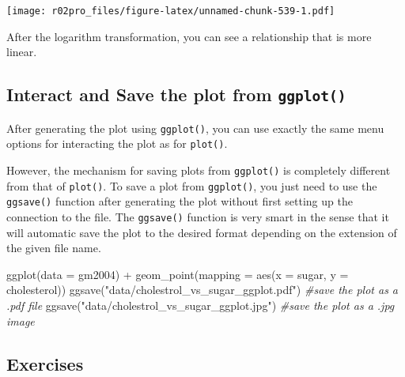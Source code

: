 \documentclass[
]{book}
\newenvironment{Shaded}{\begin{snugshade}}{\end{snugshade}}
\newcommand{\AttributeTok}[1]{\textcolor[rgb]{0.77,0.63,0.00}{#1}}
\newcommand{\CommentTok}[1]{\textcolor[rgb]{0.56,0.35,0.01}{\textit{#1}}}
\newcommand{\FunctionTok}[1]{\textcolor[rgb]{0.00,0.00,0.00}{#1}}
\newcommand{\NormalTok}[1]{#1}
\newcommand{\SpecialCharTok}[1]{\textcolor[rgb]{0.00,0.00,0.00}{#1}}
\newcommand{\StringTok}[1]{\textcolor[rgb]{0.31,0.60,0.02}{#1}}
\begin{document}
\texttt{[image: r02pro\_files/figure-latex/unnamed-chunk-539-1.pdf]}

After the logarithm transformation, you can see a relationship that is more linear.

\hypertarget{interact-and-save-the-plot-from-ggplot}{%
\subsection{\texorpdfstring{Interact and Save the plot from \texttt{ggplot()}}{Interact and Save the plot from ggplot()}}\label{interact-and-save-the-plot-from-ggplot}}

After generating the plot using \texttt{ggplot()}, you can use exactly the same menu options for interacting the plot as for \texttt{plot()}.

However, the mechanism for saving plots from \texttt{ggplot()} is completely different from that of \texttt{plot()}. To save a plot from \texttt{ggplot()}, you just need to use the \texttt{ggsave()} function after generating the plot without first setting up the connection to the file. The \texttt{ggsave()} function is very smart in the sense that it will automatic save the plot to the desired format depending on the extension of the given file name.

\begin{Shaded}
\begin{Highlighting}[]
\FunctionTok{ggplot}\NormalTok{(}\AttributeTok{data =}\NormalTok{ gm2004) }\SpecialCharTok{+} 
  \FunctionTok{geom\_point}\NormalTok{(}\AttributeTok{mapping =} \FunctionTok{aes}\NormalTok{(}\AttributeTok{x =}\NormalTok{ sugar, }
                           \AttributeTok{y =}\NormalTok{ cholesterol))}
\FunctionTok{ggsave}\NormalTok{(}\StringTok{"data/cholestrol\_vs\_sugar\_ggplot.pdf"}\NormalTok{) }\CommentTok{\#save the plot as a .pdf file}
\FunctionTok{ggsave}\NormalTok{(}\StringTok{"data/cholestrol\_vs\_sugar\_ggplot.jpg"}\NormalTok{) }\CommentTok{\#save the plot as a .jpg image}
\end{Highlighting}
\end{Shaded}

\hypertarget{exercises-31}{%
\subsection{Exercises}\label{exercises-31}}
\end{document}
